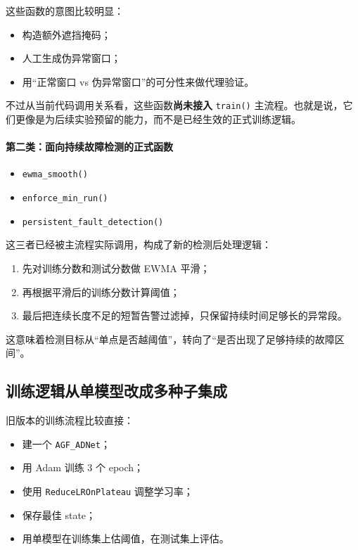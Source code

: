 \documentclass[UTF8]{ctexart}
\begin{document}
这些函数的意图比较明显：
\begin{itemize}
    \item 构造额外遮挡掩码；
    \item 人工生成伪异常窗口；
    \item 用“正常窗口 vs 伪异常窗口”的可分性来做代理验证。
\end{itemize}

不过从当前代码调用关系看，这些函数\textbf{尚未接入} \texttt{train()} 主流程。也就是说，它们更像是为后续实验预留的能力，而不是已经生效的正式训练逻辑。

\paragraph{第二类：面向持续故障检测的正式函数}
\begin{itemize}
    \item \texttt{ewma\_smooth()}
    \item \texttt{enforce\_min\_run()}
    \item \texttt{persistent\_fault\_detection()}
\end{itemize}

这三者已经被主流程实际调用，构成了新的检测后处理逻辑：
\begin{enumerate}
    \item 先对训练分数和测试分数做 EWMA 平滑；
    \item 再根据平滑后的训练分数计算阈值；
    \item 最后把连续长度不足的短暂告警过滤掉，只保留持续时间足够长的异常段。
\end{enumerate}

这意味着检测目标从“单点是否越阈值”，转向了“是否出现了足够持续的故障区间”。

\subsection{训练逻辑从单模型改成多种子集成}

旧版本的训练流程比较直接：
\begin{itemize}
    \item 建一个 \texttt{AGF\_ADNet}；
    \item 用 Adam 训练 3 个 epoch；
    \item 使用 \texttt{ReduceLROnPlateau} 调整学习率；
    \item 保存最佳 state；
    \item 用单模型在训练集上估阈值，在测试集上评估。
\end{itemize}
\end{document}
